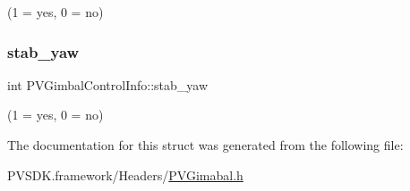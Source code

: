 (1 = yes, 0 = no) 

\mbox{\label{struct_p_v_gimbal_control_info_a3f1d390dce1cae47c2d82af9a7134421}} 
\subsubsection{\texorpdfstring{stab\+\_\+yaw}{stab\_yaw}}
{\footnotesize\ttfamily int P\+V\+Gimbal\+Control\+Info\+::stab\+\_\+yaw}



(1 = yes, 0 = no) 



The documentation for this struct was generated from the following file\+:\begin{DoxyCompactItemize}
\item 
P\+V\+S\+D\+K.\+framework/\+Headers/\hyperlink{_p_v_gimabal_8h}{P\+V\+Gimabal.\+h}\end{DoxyCompactItemize}
